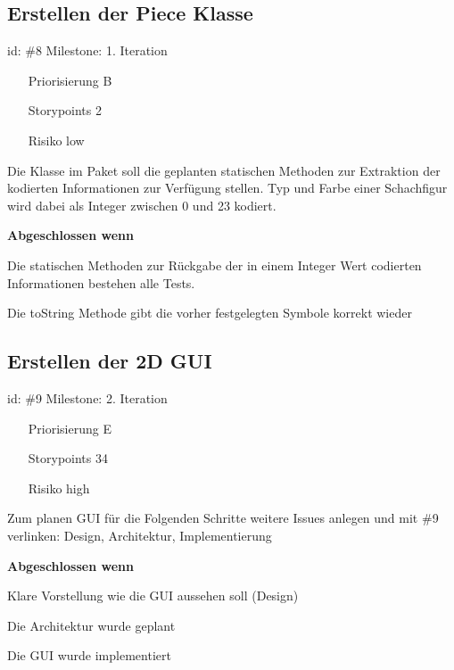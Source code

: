 \subsection*{Erstellen der Piece Klasse}
id: \#8 Milestone: 1. Iteration\\

\begin{itemize}
\item[Priorisierung] B
\item[Storypoints] 2
\item[Risiko] low
\end{itemize}

Die Klasse im Paket  soll die geplanten statischen Methoden zur Extraktion der kodierten Informationen zur Verfügung stellen. Typ und Farbe einer Schachfigur wird dabei als Integer zwischen 0 und 23 kodiert.

\textbf{Abgeschlossen wenn}
\begin{todolist}
    \item[\done]  Die statischen Methoden zur Rückgabe der in einem Integer Wert codierten Informationen bestehen alle Tests.
  \item[\done]  Die toString Methode gibt die vorher festgelegten Symbole korrekt wieder

\end{todolist}


\subsection*{Erstellen der 2D GUI}
id: \#9 Milestone: 2. Iteration\\

\begin{itemize}
\item[Priorisierung] E
\item[Storypoints] 34
\item[Risiko] high
\end{itemize}

Zum planen GUI für die Folgenden Schritte weitere Issues anlegen und mit \#9 verlinken: Design, Architektur, Implementierung

\textbf{Abgeschlossen wenn}
\begin{todolist}
    \item[\done]  Klare Vorstellung wie die GUI aussehen soll (Design)
  \item[\done]  Die Architektur wurde geplant
  \item[\done]  Die GUI wurde implementiert

\end{todolist}


